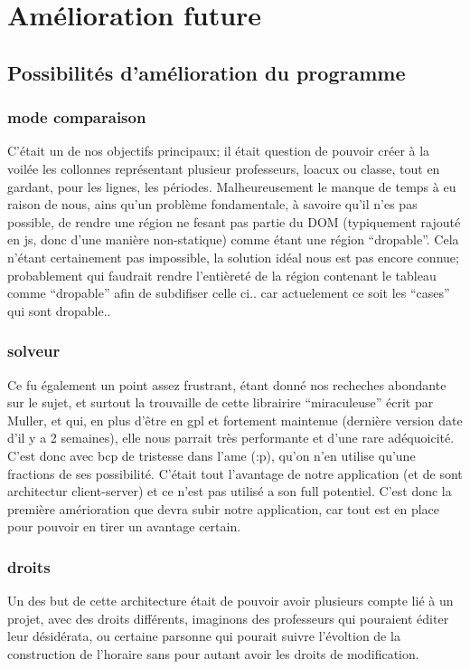\chapter{Amélioration future}

\section{Possibilités d'amélioration du programme}

\subsection{mode comparaison}
C'était un de nos objectifs principaux; il était question de pouvoir créer à la
voilée les collonnes représentant plusieur professeurs, loacux ou classe, tout
en gardant, pour les lignes, les périodes. Malheureusement le manque de temps à
eu raison de nous, ains qu'un problème fondamentale, à savoire qu'il n'es pas
possible, de rendre une région ne fesant pas partie du DOM (typiquement rajouté
en js, donc d'une manière non-statique) comme étant une région ``dropable''.
Cela n'étant certainement pas impossible, la solution idéal nous est pas encore
connue; probablement qui faudrait rendre l'entièreté de la région contenant le
tableau comme ``dropable'' afin de subdifiser celle ci.. car actuelement ce soit
les ``cases'' qui sont dropable..
\subsection{solveur}
Ce fu également un point assez frustrant, étant donné nos recheches abondante
sur le sujet, et surtout la trouvaille de cette librairire ``miraculeuse'' écrit
par Muller, et qui, en plus d'être en gpl et fortement maintenue (dernière
version date d'il y a 2 semaines), elle nous parrait très performante et d'une
rare adéquoicité.  C'est donc avec bcp de tristesse dans l'ame (:p), qu'on n'en
utilise qu'une fractions de ses possibilité.  C'était tout l'avantage de notre
application (et de sont architectur client-server) et ce n'est pas utilisé a son
full potentiel.  C'est donc la première amérioration que devra subir notre
application, car tout est en place pour pouvoir en tirer un avantage certain.
\subsection{droits}
Un des but de cette architecture était de pouvoir avoir plusieurs compte lié à
un projet, avec des droits différents, imaginons des professeurs qui pouraient
éditer leur désidérata, ou certaine parsonne qui pourait suivre l'évoltion de la
construction de l'horaire sans pour autant avoir les droits de modification.
